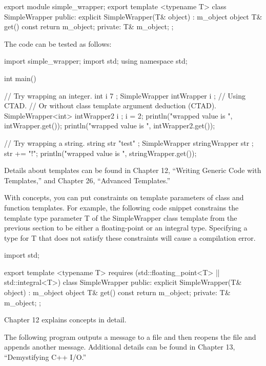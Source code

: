 \begin{cpp}
export module simple_wrapper;
export template <typename T>
class SimpleWrapper
{
    public:
        explicit SimpleWrapper(T& object) : m_object { object } { }
        T& get() const { return m_object; }
    private:
        T& m_object;
};
\end{cpp}

The code can be tested as follows:

\begin{cpp}
import simple_wrapper;
import std;
using namespace std;

int main()
{
    // Try wrapping an integer.
    int i { 7 };
    SimpleWrapper intWrapper { i }; // Using CTAD.
    // Or without class template argument deduction (CTAD).
    SimpleWrapper<int> intWrapper2 { i };
    i = 2;
    println("wrapped value is {}", intWrapper.get());
    println("wrapped value is {}", intWrapper2.get());

    // Try wrapping a string.
    string str { "test" };
    SimpleWrapper stringWrapper { str };
    str += "!";
    println("wrapped value is {}", stringWrapper.get());
}
\end{cpp}

Details about templates can be found in Chapter 12, “Writing Generic Code with Templates,” and Chapter 26, “Advanced Templates.”


With concepts, you can put constraints on template parameters of class and function templates. For example, the following code snippet constrains the template type parameter T of the SimpleWrapper class template from the previous section to be either a floating-point or an integral type. Specifying a type for T that does not satisfy these constraints will cause a compilation error.

\begin{cpp}
import std;

export template <typename T> requires (std::floating_point<T> || std::integral<T>)
class SimpleWrapper
{
    public:
        explicit SimpleWrapper(T& object) : m_object { object } { }
        T& get() const { return m_object; }
    private:
        T& m_object;
};
\end{cpp}

Chapter 12 explains concepts in detail.


The following program outputs a message to a file and then reopens the file and appends another message. Additional details can be found in Chapter 13, “Demystifying C++ I/O.”

